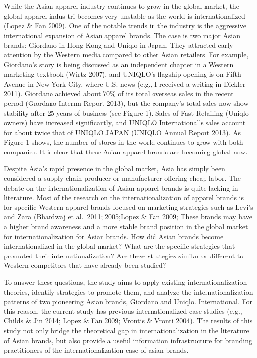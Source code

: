 \documentclass[]{article}
\begin{document}
While the Asian apparel industry continues to grow in the global market,
the global apparel indus tri becomes very unstable as the world is
internationalized (Lopez \& Fan 2009). One of the notable trends in the
industry is the aggressive international expansion of Asian apparel
brands. The case is two major Asian brands: Giordano in Hong Kong and
Uniqlo in Japan. They attracted early attention by the Western media
compared to other Asian retailers. For example, Giordano's story is
being discussed as an independent chapter in a Western marketing
textbook (Wirtz 2007), and UNIQLO's flagship opening is on Fifth Avenue
in New York City, where U.S. news (e.g., I received a writing in Dickler
2011). Giordano achieved about 70\% of its total overseas sales in the
recent period (Giordano Interim Report 2013), but the company's total
sales now show stability after 25 years of business (see Figure 1).
Sales of Fast Retailing (Uniqlo owners) have increased significantly,
and UNIQLO International's sales account for about twice that of UNIQLO
JAPAN (UNIQLO Annual Report 2013). As Figure 1 shows, the number of
stores in the world continues to grow with both companies. It is clear
that these Asian apparel brands are becoming global now.

Despite Asia's rapid presence in the global market, Asia has simply been
considered a supply chain producer or manufacturer offering cheap labor.
The debate on the internationalization of Asian apparel brands is quite
lacking in literature. Most of the research on the internationalization
of apparel brands is for specific Western apparel brands focused on
marketing strategies such as Levi's and Zara (Bhardwaj et al.~2011;
2005;Lopez \& Fan 2009; These brands may have a higher brand awareness
and a more stable brand position in the global market for
internationalization for Asian brands. How did Asian brands become
internationalized in the global market? What are the specific strategies
that promoted their internationalization? Are these strategies similar
or different to Western competitors that have already been studied?

To answer these questions, the study aims to apply existing
internationalization theories, identify strategies to promote them, and
analyze the internationalization patterns of two pioneering Asian
brands, Giordano and Uniqlo. International. For this reason, the current
study has previous internationalized case studies (e.g., Childs \& Jin
2014; Lopez \& Fan 2009; Vrontis \& Vronti 2004). The results of this
study not only bridge the theoretical gap in internationalization in the
literature of Asian brands, but also provide a useful information
infrastructure for branding practitioners of the internationalization
case of asian brands.
\end{document}
